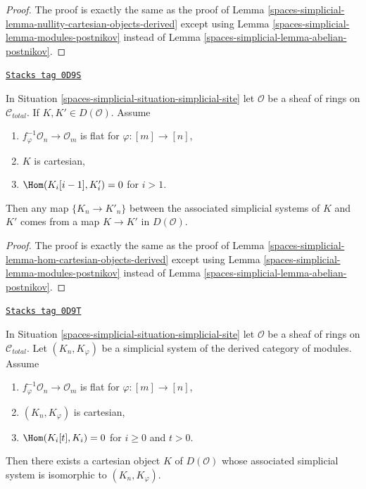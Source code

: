 \begin{proof}
The proof is exactly the same as the proof of
Lemma \ref{spaces-simplicial-lemma-nullity-cartesian-objects-derived} except using
Lemma \ref{spaces-simplicial-lemma-modules-postnikov} instead of
Lemma \ref{spaces-simplicial-lemma-abelian-postnikov}.
\end{proof}

\begin{lemma}
\label{spaces-simplicial-lemma-hom-cartesian-modules-derived}
\href{https://stacks.math.columbia.edu/tag/0D9S}{\texttt{Stacks tag 0D9S}}

In Situation \ref{spaces-simplicial-situation-simplicial-site} let $\mathcal{O}$ be
a sheaf of rings on $\mathcal{C}_{total}$.
If $K, K' \in D(\mathcal{O})$.
Assume
\begin{enumerate}
\item $f_\varphi^{-1}\mathcal{O}_n \to \mathcal{O}_m$ is flat for
$\varphi : [m] \to [n]$,
\item $K$ is cartesian,
\item $\Hom(K_i[i - 1], K'_i) = 0$ for $i > 1$.
\end{enumerate}
Then any map $\{K_n \to K'_n\}$ between the associated simplicial systems
of $K$ and $K'$ comes from a map $K \to K'$ in $D(\mathcal{O})$.
\end{lemma}

\begin{proof}
The proof is exactly the same as the proof of
Lemma \ref{spaces-simplicial-lemma-hom-cartesian-objects-derived} except using
Lemma \ref{spaces-simplicial-lemma-modules-postnikov} instead of
Lemma \ref{spaces-simplicial-lemma-abelian-postnikov}.
\end{proof}

\begin{lemma}
\label{spaces-simplicial-lemma-cartesian-module-derived-from-simplicial}
\href{https://stacks.math.columbia.edu/tag/0D9T}{\texttt{Stacks tag 0D9T}}

In Situation \ref{spaces-simplicial-situation-simplicial-site} let $\mathcal{O}$ be
a sheaf of rings on $\mathcal{C}_{total}$. Let
$(K_n, K_\varphi)$ be a simplicial system of the derived category
of modules. Assume
\begin{enumerate}
\item $f_\varphi^{-1}\mathcal{O}_n \to \mathcal{O}_m$ is flat for
$\varphi : [m] \to [n]$,
\item $(K_n, K_\varphi)$ is cartesian,
\item $\Hom(K_i[t], K_i) = 0$ for $i \geq 0$ and $t > 0$.
\end{enumerate}
Then there exists a cartesian object $K$ of $D(\mathcal{O})$
whose associated simplicial system is isomorphic to $(K_n, K_\varphi)$.
\end{lemma}

